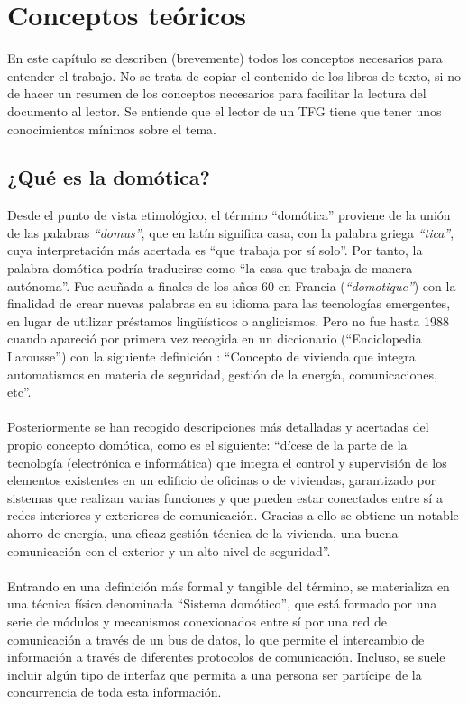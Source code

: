 \chapter{Conceptos teóricos}

En este capítulo se describen (brevemente) todos los conceptos necesarios para entender el trabajo. No se trata de copiar el contenido de los libros de texto, si no de hacer un resumen de los conceptos necesarios para facilitar la lectura del documento al lector. Se entiende que el lector de un TFG tiene que tener unos conocimientos mínimos sobre el tema.

\section{¿Qué es la domótica?}

Desde el punto de vista etimológico, el término “domótica” proviene de la unión de las palabras \textit{“domus”}, que en latín significa casa, con la palabra griega \textit{“tica”}, cuya interpretación más acertada es “que trabaja por sí solo”. Por tanto, la palabra domótica podría traducirse como “la casa que trabaja de manera autónoma”. Fue acuñada a finales de los años 60 en Francia (\textit{“domotique”}) con la finalidad de crear nuevas palabras en su idioma para las tecnologías emergentes, en lugar de utilizar préstamos lingüísticos o anglicismos. Pero no fue hasta 1988 cuando apareció por primera vez recogida en un diccionario (“Enciclopedia Larousse”) con la siguiente definición \cite{Larousse:1988}: “Concepto de vivienda que integra automatismos en materia de seguridad, gestión de la energía, comunicaciones, etc”. \\\\
Posteriormente se han recogido descripciones más detalladas y acertadas del propio concepto domótica, como es el siguiente\cite{Quezada:2017}: “dícese de la parte de la tecnología (electrónica e informática) que integra el control y supervisión de los elementos existentes en un edificio de oficinas o de viviendas, garantizado por sistemas que realizan varias funciones y que pueden estar conectados entre sí a redes interiores y exteriores de comunicación. Gracias a ello se obtiene un notable ahorro de energía, una eficaz gestión técnica de la vivienda, una buena comunicación con el exterior y un alto nivel de seguridad”.\\\\
Entrando en una definición más formal y tangible del término, se materializa en una técnica física denominada “Sistema domótico”, que está formado por una serie de módulos y mecanismos conexionados entre sí por una red de comunicación a través de un bus de datos, lo que permite el intercambio de información a través de diferentes protocolos de comunicación. Incluso, se suele incluir algún tipo de interfaz que permita a una persona ser partícipe de la concurrencia de toda esta información.\\\\
